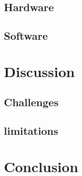 \documentclass[a4paper,twoside]{article}
\begin{document}
\subsection{Hardware}

\subsection{Software}



\section{Discussion}

\subsection{Challenges}

\subsection{limitations}



\section{Conclusion}






% 

 


\end{document}
